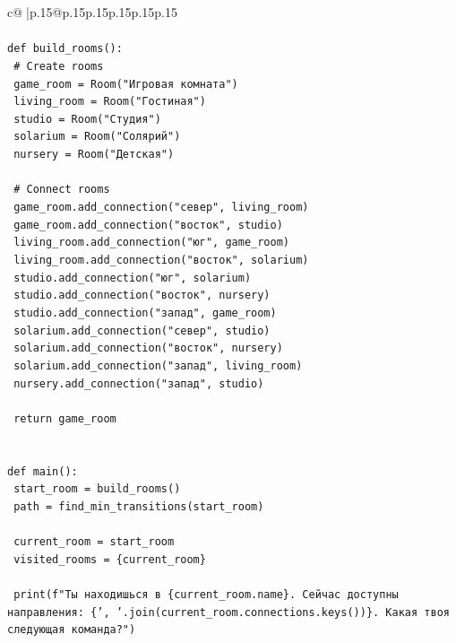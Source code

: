 \documentclass{article}
\begin{document}
{\begin{supertabular}{c@{$\;$}|p{.15\linewidth}@{}p{.15\linewidth}p{.15\linewidth}p{.15\linewidth}p{.15\linewidth}p{.15\linewidth}}
{{{\\ 
\\ 
\texttt{def build\_rooms():} \\
\texttt{    \# Create rooms} \\
\texttt{    game\_room = Room("Игровая комната")} \\
\texttt{    living\_room = Room("Гостиная")} \\
\texttt{    studio = Room("Студия")} \\
\texttt{    solarium = Room("Солярий")} \\
\texttt{    nursery = Room("Детская")} \\
\\ 
\texttt{    \# Connect rooms} \\
\texttt{    game\_room.add\_connection("север", living\_room)} \\
\texttt{    game\_room.add\_connection("восток", studio)} \\
\texttt{    living\_room.add\_connection("юг", game\_room)} \\
\texttt{    living\_room.add\_connection("восток", solarium)} \\
\texttt{    studio.add\_connection("юг", solarium)} \\
\texttt{    studio.add\_connection("восток", nursery)} \\
\texttt{    studio.add\_connection("запад", game\_room)} \\
\texttt{    solarium.add\_connection("север", studio)} \\
\texttt{    solarium.add\_connection("восток", nursery)} \\
\texttt{    solarium.add\_connection("запад", living\_room)} \\
\texttt{    nursery.add\_connection("запад", studio)} \\
\\ 
\texttt{    return game\_room} \\
\\ 
\\ 
\texttt{def main():} \\
\texttt{    start\_room = build\_rooms()} \\
\texttt{    path = find\_min\_transitions(start\_room)} \\
\\ 
\texttt{    current\_room = start\_room} \\
\texttt{    visited\_rooms = \{current\_room\}} \\
\\ 
\texttt{    print(f"Ты находишься в \{current\_room.name\}. Сейчас доступны направления: \{', '.join(current\_room.connections.keys())\}. Какая твоя следующая команда?")} \\
}}}
\end{supertabular}}
\end{document}
